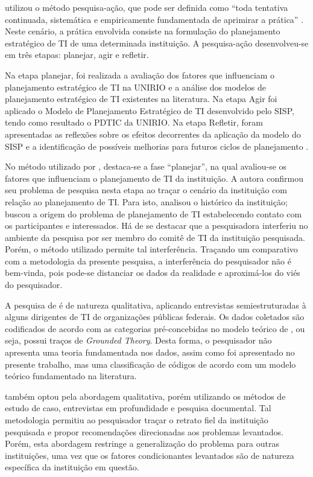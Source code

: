 utilizou o método pesquisa-ação, que pode ser definida como ``toda tentativa continuada, sistemática e empiricamente fundamentada de aprimirar a prática'' \cite{tripp:05}. Neste cenário, a prática envolvida consiste na formulação do planejamento estratégico de TI de uma determinada instituição. A pesquisa-ação desenvolveu-se em três etapas: planejar, agir e refletir.

\begin{citacao}
Na etapa planejar, foi realizada a avaliação dos fatores que influenciam o planejamento estratégico de TI na UNIRIO e a análise dos modelos de planejamento estratégico de TI existentes na literatura. Na etapa Agir foi aplicado o Modelo de Planejamento Estratégico de TI desenvolvido pelo SISP, tendo como resultado o PDTIC da UNIRIO. Na etapa Refletir, foram apresentadas as reflexões sobre os efeitos decorrentes da aplicação da modelo do SISP e a identificação de possíveis melhorias para futuros ciclos de planejamento \cite{paula:12}.
\end{citacao}

No método utilizado por , destaca-se a fase ``planejar'', na qual avaliou-se os fatores que influenciam o planejamento de TI da instituição. A autora confirmou seu problema de pesquisa nesta etapa ao traçar o cenário da instituição com relação ao planejamento de TI. Para isto, analisou o histórico da instituição; buscou a origem do problema de planejamento de TI estabelecendo contato com os participantes e interessados. Há de se destacar que a pesquisadora interferiu no ambiente da pesquisa por ser membro do comitê de TI da instituição pesquisada. Porém, o método utilizado permite tal interferência. Traçando um comparativo com a metodologia da presente pesquisa, a interferência do pesquisador não é bem-vinda, pois pode-se distanciar os dados da realidade e aproximá-los do viés do pesquisador.

A pesquisa de  é de natureza qualitativa, aplicando entrevistas semiestruturadas à alguns dirigentes de TI de organizações públicas federais. Os dados coletados são codificados de acordo com as categorias pré-concebidas no modelo teórico de , ou seja, possui traços de \textit{Grounded Theory}. Desta forma, o pesquisador não apresenta uma teoria fundamentada nos dados, assim como foi apresentado no presente trabalho, mas uma classificação de códigos de acordo com um modelo teórico fundamentado na literatura.

 também optou pela abordagem qualitativa, porém utilizando os métodos de estudo de caso, entrevistas em profundidade e pesquisa documental. Tal metodologia permitiu ao pesquisador traçar o retrato fiel da instituição pesquisada e propor recomendações direcionadas aos problemas levantados. Porém, esta abordagem restringe a generalização do problema para outras instituições, uma vez que os fatores condicionantes levantados são de natureza específica da instituição em questão.

